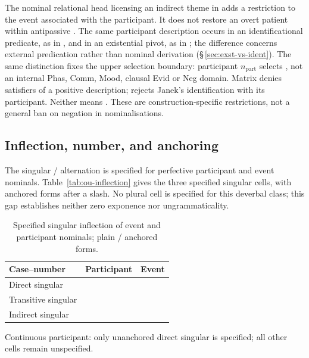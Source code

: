 \pex
\a {} 
\a {} 
\a {} 
\a {} 
\xe

The nominal relational head licensing an indirect theme in
 adds a restriction to the event associated with the
participant. It does not restore an overt patient within antipassive
. The same participant description occurs in an identificational
predicate, as in , and in an existential pivot,
as in ; the difference concerns external
predication rather than nominal derivation (§\,\ref{sec:exst-vs-ident}).
The same distinction fixes the upper selection boundary: participant
$n_{\mathrm{part}}$ selects , not an internal Phas, Comm,
Mood, clausal Evid or Neg domain. Matrix 
 denies satisfiers of a positive description;
 rejects Janek's identification with its
participant. Neither means .
These are construction-specific restrictions, not a general ban on negation
in nominalisations.

\subsection{Inflection, number, and anchoring}
\label{sec:nm-derived-inflection}

The singular / alternation is specified for perfective
participant and event nominals. Table~\ref{tab:ou-inflection} gives the three specified singular cells,
with anchored forms after a slash. No plural cell is specified for this
deverbal class; this gap establishes neither zero exponence nor ungrammaticality.

\begin{table}[htbp]
\footnotesize
\caption{Specified singular inflection of event and participant nominals;
plain / anchored forms.}\label{tab:ou-inflection}
\label{tab:ova-inflection}
\begin{tabularx}{\textwidth}{l L L}
\toprule
Case--number & Participant  & Event  \\
\midrule
Direct singular &  &  \\
Transitive singular &  &  \\
Indirect singular &  &  \\
\bottomrule
\end{tabularx}
\par\smallskip
\begin{minipage}{\textwidth}
Continuous participant: only unanchored direct singular 
 is specified; all other cells remain unspecified.
\end{minipage}
\end{table}

